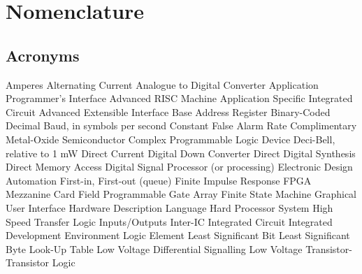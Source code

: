 \chapter{Nomenclature}
{\renewcommand{\thesection}{\arabic{section}}

\section{Acronyms}

\begin{List}
         {Amperes}
        {Alternating Current}
       {Analogue to Digital Converter}
       {Application Programmer's Interface}
       {Advanced RISC Machine}
      {Application Specific Integrated Circuit}
       {Advanced Extensible Interface}
       {Base Address Register}
       {Binary-Coded Decimal}
        {Baud, in symbols per second}
      {Constant False Alarm Rate}
      {Complimentary Metal-Oxide Semiconductor}
      {Complex Programmable Logic Device}
       {Deci-Bell, relative to 1 mW}
        {Direct Current}
       {Digital Down Converter}
       {Direct Digital Synthesis}
       {Direct Memory Access}
       {Digital Signal Processor (or processing)}
       {Electronic Design Automation}
      {First-in, First-out (queue)}
       {Finite Impulse Response}
       {FPGA Mezzanine Card}
      {Field Programmable Gate Array}
       {Finite State Machine}
       {Graphical User Interface}
       {Hardware Description Language}
       {Hard Processor System}
      {High Speed Transfer Logic}
       {Inputs/Outputs}
    \abbr{\IIC}  {Inter-IC}
        {Integrated Circuit}
       {Integrated Development Environment}
        {Logic Element}
       {Least Significant Bit}
       {Least Significant Byte}
       {Look-Up Table}
      {Low Voltage Differential Signalling}
     {Low Voltage Transistor-Transistor Logic}

\end{List}}
